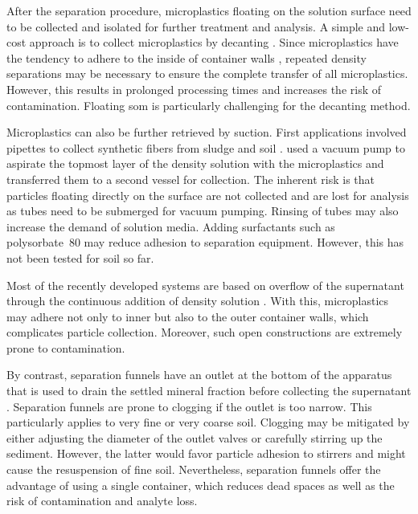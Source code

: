 After the separation procedure, microplastics floating on the solution surface need to be collected and isolated for further treatment and analysis. A simple and low-cost approach is to collect microplastics by decanting \citep{BesleyStandardized2017,HuangAgricultural2020,ZhangSimple2018,ScheurerMicroplastics2018}. Since microplastics have the tendency to adhere to the inside of container walls \citep{NakajimaSmall2019}, repeated density separations may be necessary to ensure the complete transfer of all microplastics. However, this results in prolonged processing times and increases the risk of contamination. Floating \ac{som} is particularly challenging for the decanting method.

Microplastics can also be further retrieved by suction. First applications involved pipettes to collect synthetic fibers from sludge and soil \citep{ZubrisSynthetic2005,Prendergast-MillerPolyesterderived2019}.  used a vacuum pump to aspirate the topmost layer of the density solution with the microplastics and transferred them to a second vessel for collection.
The inherent risk is that particles floating directly on the surface are not collected and are lost for analysis as tubes need to be submerged for vacuum pumping. Rinsing of tubes may also increase the demand of solution media. Adding surfactants such as polysorbate~80 \citep{EndersWhen2020} may reduce adhesion to separation equipment.
However, this has not been tested for soil so far.

Most of the recently developed systems are based on overflow of the supernatant through the continuous addition of density solution \citep{NuelleNew2014,ZhouMicroplastics2020,VermeirenMicroplastic2020,WangPoor2018,LiuMicroplastic2018,LiuMethod2019,HanOptimized2019}. With this, microplastics may adhere not only to inner but also to the outer container walls, which complicates particle collection. Moreover, such open constructions are extremely prone to contamination.

By contrast, separation funnels have an outlet at the bottom of the apparatus that is used to drain the settled mineral fraction before collecting the supernatant \citep{WangPoor2018,NuelleNew2014,MahonMicroplastics2017}. Separation funnels are prone to clogging if the outlet is too narrow. This particularly applies to very fine or very coarse soil. Clogging may be mitigated by either adjusting the diameter of the outlet valves \citep{EndersWhen2020} or carefully stirring up the sediment. However, the latter would favor particle adhesion to stirrers and might cause the resuspension of fine soil. Nevertheless, separation funnels offer the advantage of using a single container, which reduces dead spaces as well as the risk of contamination and analyte loss.

